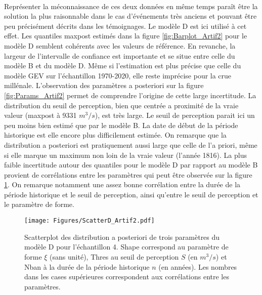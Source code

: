 \documentclass[11pt]{article}
\begin{document}
	\paragraph{} Représenter la méconnaissance de ces deux données en même temps paraît être la solution la plus raisonnable dans le cas d'événements très anciens et pouvant être peu précisément décrits dans les témoignages. Le modèle D est ici utilisé à cet effet. Les quantiles maxpost estimés dans la figure \ref{fig:Barplot_Artif2} pour le modèle D semblent cohérents avec les valeurs de référence. En revanche, la largeur de l'intervalle de confiance est importante et se situe entre celle du modèle B et du modèle D. Même si l'estimation est plus précise que celle du modèle GEV sur l'échantillon 1970-2020, elle reste imprécise pour la crue millénale. L'observation des paramètres a posteriori sur la figure \ref{fig:Params_Artif2} permet de comprendre l'origine de cette large incertitude. La distribution du seuil de perception, bien que centrée a proximité de la vraie valeur (maxpost à 9331 $m^3/s$), est très large. Le seuil de perception parait ici un peu moins bien estimé que par le modèle B. La date de début de la période historique est elle encore plus difficilement estimée. On remarque que la distribution a posteriori est pratiquement aussi large que celle de l'a priori, même si elle marque un maximum non loin de la vraie valeur (l'année 1816). La plus faible incertitude autour des quantiles pour le modèle D par rapport au modèle B provient de corrélations entre les paramètres qui peut être observée sur la figure \ref{fig:ScatterD_Artif2}. On remarque notamment une assez bonne corrélation entre la durée de la période historique et le seuil de perception, ainsi qu'entre le seuil de perception et le paramètre de forme.
	
	\begin{figure}[h]
		\centering
		\texttt{[image: Figures/ScatterD\_Artif2.pdf]}
		\caption{Scatterplot des distribution a posteriori de trois paramètres du modèle D pour l'échantillon 4. Shape correspond au paramètre de forme $\xi$ (sans unité), Thres au seuil de perception $S$ (en $m^3/s$) et Nban à la durée de la période historique $n$ (en années). Les nombres dans les cases supérieures correspondent aux corrélations entre les paramètres.}
		\label{fig:ScatterD_Artif2}
	\end{figure}
	
\end{document}
